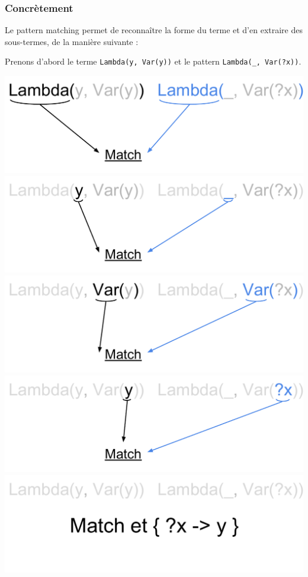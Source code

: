 \begin{frame}
\frametitle{Concrètement}

Le pattern matching permet de reconnaître la forme du terme et d'en extraire des
sous-termes, de la manière suivante :

Prenons d'abord le terme \texttt{Lambda(y, Var(y))} et le pattern
\texttt{Lambda(\_, Var(?x))}.

\bigskip
\begin{center}
      {\includegraphics[scale=0.5]{pattern/trivial1.pdf}}
      {\includegraphics[scale=0.5]{pattern/trivial2.pdf}}
      {\includegraphics[scale=0.5]{pattern/trivial3.pdf}}
      {\includegraphics[scale=0.5]{pattern/trivial4.pdf}}
      {\includegraphics[scale=0.5]{pattern/trivial5.pdf}}


\end{center}
\end{frame}
